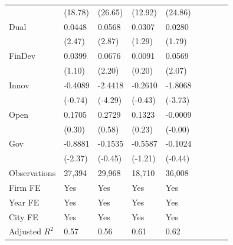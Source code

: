 \begin{table}[htbp]
\begin{tabularx}{\textwidth}{lYYYYYYYY@{}}
                &  (18.78)         &  (26.65)         &  (12.92)         &  (24.86)         \\
Dual            &   0.0448\sym{**} &   0.0568\sym{***}&   0.0307         &   0.0280\sym{*}  \\
                &   (2.47)         &   (2.87)         &   (1.29)         &   (1.79)         \\
FinDev          &   0.0399         &   0.0676\sym{**} &   0.0091         &   0.0569\sym{**} \\
                &   (1.10)         &   (2.20)         &   (0.20)         &   (2.07)         \\
Innov           &  -0.4089         &  -2.4418\sym{***}&  -0.2610         &  -1.8068\sym{***}\\
                &  (-0.74)         &  (-4.29)         &  (-0.43)         &  (-3.73)         \\
Open            &   0.1705         &   0.2729         &   0.1323         &  -0.0009         \\
                &   (0.30)         &   (0.58)         &   (0.23)         &  (-0.00)         \\
Gov             &  -0.8881\sym{**} &  -0.1535         &  -0.5587         &  -0.1024         \\
                &  (-2.37)         &  (-0.45)         &  (-1.21)         &  (-0.44)         \\
\hline
Observations    &   27,394         &   29,968         &   18,710         &   36,008         \\
Firm FE         &      Yes         &      Yes         &      Yes         &      Yes         \\
Year FE         &      Yes         &      Yes         &      Yes         &      Yes         \\
City FE         &      Yes         &      Yes         &      Yes         &      Yes         \\
Adjusted $ R^2$ &     0.57         &     0.56         &     0.61         &     0.62         \\
\bottomrule
\end{tabularx}
\end{table}
